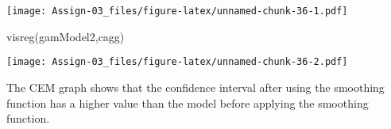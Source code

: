 \documentclass[
]{article}
\newenvironment{Shaded}{\begin{snugshade}}{\end{snugshade}}
\newcommand{\FunctionTok}[1]{\textcolor[rgb]{0.00,0.00,0.00}{#1}}
\newcommand{\NormalTok}[1]{#1}
\newcommand{\StringTok}[1]{\textcolor[rgb]{0.31,0.60,0.02}{#1}}
\begin{document}
\texttt{[image: Assign-03\_files/figure-latex/unnamed-chunk-36-1.pdf]}

\begin{Shaded}
\begin{Highlighting}[]
\FunctionTok{visreg}\NormalTok{(gamModel2,}\StringTok{\textquotesingle{}cagg\textquotesingle{}}\NormalTok{)}
\end{Highlighting}
\end{Shaded}

\texttt{[image: Assign-03\_files/figure-latex/unnamed-chunk-36-2.pdf]}

The CEM graph shows that the confidence interval after using the
smoothing function has a higher value than the model before applying the
smoothing function.
\end{document}
